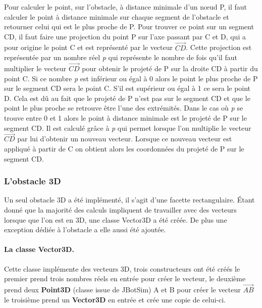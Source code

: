 \documentclass{article}
\begin{document}
Pour calculer le point, sur l'obstacle, à distance minimale d'un n\oe ud P, il faut calculer le point à distance minimale sur chaque segment de l'obstacle et retourner celui qui est le plus proche de P. Pour trouver ce point sur un segment CD, il faut faire une projection du point P sur l'axe passant par C et D, qui a pour origine le point C et est représenté par le vecteur $\overrightarrow{CD}$. Cette projection est représentée par un nombre réel \emph{p} qui représente le nombre de fois qu'il faut multiplier le vecteur $\overrightarrow{CD}$ pour obtenir le projeté de P sur la droite CD à partir du point C. Si ce nombre \emph{p} est inférieur ou égal à 0 alors le point le plus proche de P sur le segment CD sera le point C. S'il est supérieur ou égal à 1 ce sera le point D. Cela est dû au fait que le projeté de P n'est pas sur le segment CD et que le point le plus proche se retrouve être l'une des extrémités. Dans le cas où \emph{p} se trouve entre 0 et 1 alors le point à distance minimale est le projeté de P sur le segment CD. Il est calculé grâce à \emph{p} qui permet lorsque l'on multiplie le vecteur $\overrightarrow{CD}$ par lui d'obtenir un nouveau vecteur. Lorsque ce nouveau vecteur est appliqué à partir de C on obtient alors les coordonnées du projeté de P sur le segment CD.

\subsubsection{L'obstacle 3D}

Un seul obstacle 3D a été implémenté, il s'agit d'une facette rectangulaire. Étant  donné que la majorité des calculs impliquent de travailler avec des vecteurs lorsque que l'on est en 3D, une classe Vector3D a été créée. De plus une exception dédiée à l'obstacle a elle aussi été ajoutée.

\paragraph{La classe Vector3D.}

Cette classe implémente des vecteurs 3D, trois constructeurs ont été créés le premier prend trois nombres réels en entrée pour créer le vecteur, le deuxième prend deux \textbf{Point3D} (classe issue de JBotSim) A et B pour créer le vecteur $\overrightarrow{AB}$ le troisième prend un \textbf{Vector3D} en entrée et crée une copie de celui-ci.\medskip
\end{document}
